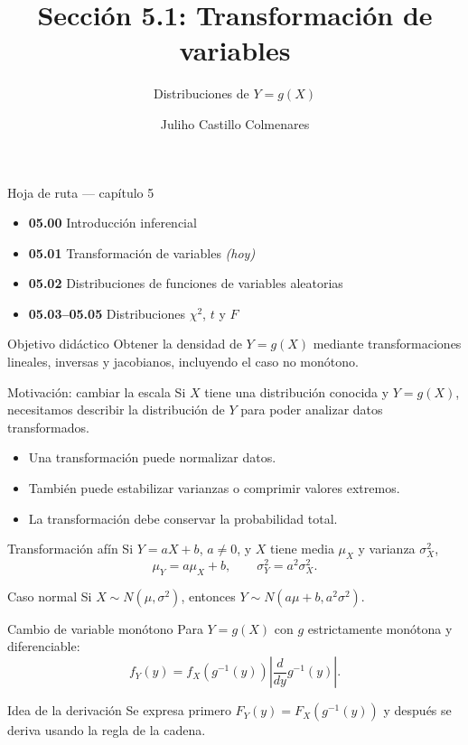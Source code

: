 \documentclass[10pt,aspectratio=169]{beamer}
\title[Transformación de variables]{Sección 5.1: Transformación de variables}
\subtitle{Distribuciones de $Y=g(X)$}
\author[J. Castillo Colmenares]{Juliho Castillo Colmenares}
\institute{Tecnológico de Monterrey}
\date{}
\begin{document}
\begin{frame}[plain]\vspace{-0.8cm}\titlepage\end{frame}

\begin{frame}{Hoja de ruta --- capítulo 5}
  \footnotesize
  \begin{itemize}\itemsep=0.08cm
    \item \textbf{05.00} Introducción inferencial
    \item \textbf{05.01} Transformación de variables \emph{(hoy)}
    \item \textbf{05.02} Distribuciones de funciones de variables aleatorias
    \item \textbf{05.03--05.05} Distribuciones $\chi^2$, $t$ y $F$
  \end{itemize}
  \begin{block}{Objetivo didáctico}
    Obtener la densidad de $Y=g(X)$ mediante transformaciones lineales,
    inversas y jacobianos, incluyendo el caso no monótono.
  \end{block}
\end{frame}

\begin{frame}{Motivación: cambiar la escala}
  \footnotesize
  Si $X$ tiene una distribución conocida y $Y=g(X)$, necesitamos describir la
  distribución de $Y$ para poder analizar datos transformados.
  \begin{itemize}\itemsep=0.12cm
    \item Una transformación puede normalizar datos.
    \item También puede estabilizar varianzas o comprimir valores extremos.
    \item La transformación debe conservar la probabilidad total.
  \end{itemize}
\end{frame}

\begin{frame}{Transformación afín}
  \footnotesize
  Si $Y=aX+b$, $a\neq0$, y $X$ tiene media $\mu_X$ y varianza $\sigma_X^2$,
  \[
    \mu_Y=a\mu_X+b,\qquad \sigma_Y^2=a^2\sigma_X^2.
  \]
  \begin{alertblock}{Caso normal}
    Si $X\sim N(\mu,\sigma^2)$, entonces
    $Y\sim N(a\mu+b,a^2\sigma^2)$.
  \end{alertblock}
\end{frame}

\begin{frame}{Cambio de variable monótono}
  \footnotesize
  Para $Y=g(X)$ con $g$ estrictamente monótona y diferenciable:
  \[
    f_Y(y)=f_X\!\left(g^{-1}(y)\right)
    \left|\frac{d}{dy}g^{-1}(y)\right|.
  \]
  \begin{block}{Idea de la derivación}
    Se expresa primero $F_Y(y)=F_X(g^{-1}(y))$ y después se deriva usando la
    regla de la cadena.
  \end{block}
\end{frame}
\end{document}
